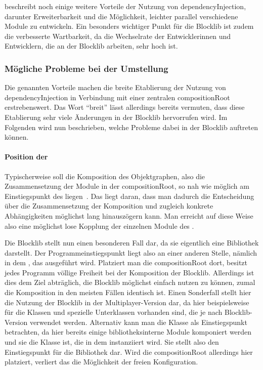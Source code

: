 \textcite[S.~15~\psqq]{Seemann2012} beschreibt noch einige weitere Vorteile der Nutzung von \gls{dependencyInjection}, darunter Erweiterbarkeit und die Möglichkeit, leichter parallel verschiedene Module zu entwickeln. Ein besonders wichtiger Punkt für die Blocklib ist zudem die verbesserte Wartbarkeit, da die Wechselrate der Entwicklerinnen und Entwicklern, die an der Blocklib arbeiten, sehr hoch ist.

\subsubsection{Mögliche Probleme bei der Umstellung}
Die genannten Vorteile machen die breite Etablierung der Nutzung von \gls{dependencyInjection} in Verbindung mit einer zentralen \gls{compositionRoot} erstrebenswert. Das Wort \enquote{breit} lässt allerdings bereits vermuten, dass diese Etablierung sehr viele Änderungen in der Blocklib hervorrufen wird. Im Folgenden wird nun beschrieben, welche Probleme dabei in der Blocklib auftreten können.

\paragraph{Position der }
Typischerweise soll die Komposition des Objektgraphen, also die Zusammensetzung der Module in der \gls{compositionRoot}, so nah wie möglich am Einstiegspunkt des  liegen~\cites[S.~232~\psqq]{Martin17}[S.~76~\psq]{Seemann2012}. Das liegt daran, dass man dadurch die Entscheidung über die Zusammensetzung der Komposition und zugleich konkrete Abhängigkeiten möglichst lang hinauszögern kann. Man erreicht auf diese Weise also eine möglichst lose Kopplung der einzelnen Module des .

Die Blocklib stellt nun einen besonderen Fall dar, da sie eigentlich eine Bibliothek darstellt. Der Programmeinstiegspunkt liegt also an einer anderen Stelle, nämlich in dem \classBlockLibProgram{}, das ausgeführt wird. Platziert man die \gls{compositionRoot} dort, besitzt jedes \gls{Programm} völlige Freiheit bei der Komposition der Blocklib. Allerdings ist dies dem Ziel abträglich, die Blocklib möglichst einfach nutzen zu können, zumal die Komposition in den meisten Fällen identisch ist. Einen Sonderfall stellt hier die Nutzung der Blocklib in der Multiplayer-Version dar, da hier beispielsweise für die Klassen \classWorldInteraction{} und \classContext{} spezielle Unterklassen vorhanden sind, die je nach Blocklib-Version verwendet werden. Alternativ kann man die Klasse \classGame{} als Einstiegspunkt betrachten, da hier bereits einige bibliotheksinterne Module komponiert werden und sie die Klasse ist, die in dem \classBlockLibProgram{} instanziiert wird. Sie stellt also den Einstiegspunkt für die Bibliothek dar. Wird die \gls{compositionRoot} allerdings hier platziert, verliert das \classBlockLibProgram{} die Möglichkeit der freien Konfiguration.

